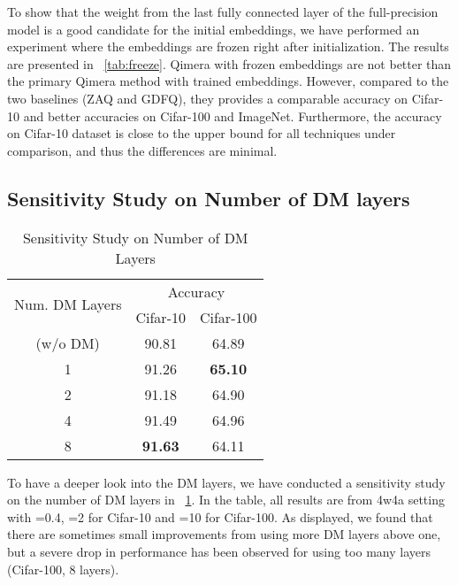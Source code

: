 \documentclass{article}
\newcommand{\aname}{Qimera\xspace}
\newcommand{\rev}[1]{{\color{olivegreen}#1}}
\renewcommand{\rev}[1]{#1}
\begin{document}
{To show that the weight from the last fully connected layer of the full-precision model is a good candidate for the initial embeddings, we have performed an experiment where the embeddings are frozen right after initialization.
The results are presented in \tablename~\ref{tab:freeze}. 
\aname with frozen embeddings are not better than the primary \aname method with trained embeddings.
However, compared to the two baselines (ZAQ and GDFQ), they provides a comparable accuracy on Cifar-10 and better accuracies on Cifar-100 and ImageNet. 
Furthermore, the accuracy on Cifar-10 dataset is close to the upper bound for all techniques under comparison, and thus the differences are minimal.

\rev{
\subsection{Sensitivity Study on Number of DM layers}
\begin{table}[h]
\rev{
    \centering


    \caption{Sensitivity Study on Number of DM Layers}
    \label{tab:dmlayer}
    


    \begin{tabular}{ccc}
    \toprule
    \multirow{2}{*}{Num. DM Layers} & \multicolumn{2}{c}{Accuracy} \\
    \cmidrule(lr){2-3}
    & Cifar-10 & Cifar-100 \\
      \midrule
    (w/o DM) &  90.81 & 64.89 \\
     1 & 91.26 & \textbf{65.10} \\
     2 & 91.18 & 64.90 \\
     4 & 91.49 & 64.96 \\
     8 & \textbf{91.63} & 64.11 \\
      \bottomrule
      
    \end{tabular} 
    }
\end{table}
To have a deeper look into the DM layers, we have conducted a sensitivity study on the number of DM layers in \tablename~\ref{tab:dmlayer}.
In the table, all results are from 4w4a setting with =0.4, =2 for Cifar-10 and =10 for Cifar-100. As displayed, we found that there are sometimes small improvements from using more DM layers above one, but a severe drop in performance has been observed for using too many layers (Cifar-100, 8 layers).


}
}
\end{document}
